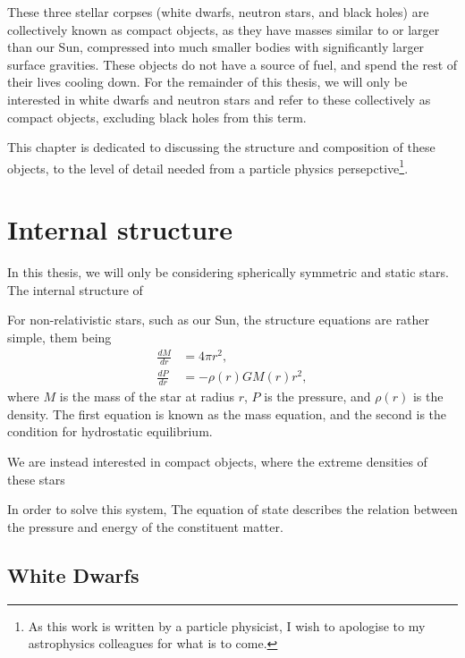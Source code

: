 These three stellar corpses (white dwarfs, neutron stars, and black holes) are collectively known as compact objects, as they have masses similar to or larger than our Sun, compressed into much smaller bodies with significantly larger surface gravities. These objects do not have a source of fuel, and spend the rest of their lives cooling down. For the remainder of this thesis, we will only be interested in white dwarfs and neutron stars and refer to these collectively as compact objects, excluding black holes from this term. 

This chapter is dedicated to discussing the structure and composition of these objects, to the level of detail needed from a particle physics persepctive\footnote{As this work is written by a particle physicist, I wish to apologise to my astrophysics colleagues for what is to come.}.


\section{Internal structure}

In this thesis, we will only be considering spherically symmetric and static stars. 
The internal structure of 

For non-relativistic stars, such as our Sun, the structure equations are
rather simple, them being
\begin{align}
\frac{d M}{dr}  &= 4 \pi r^2,\\
\frac{d P }{dr} &= -\rho(r) G M(r) r^2,
\end{align}
where $M$ is the mass of the star at radius $r$, $P$ is the pressure,
and $\rho(r)$ is the density.
The first equation is known as the mass equation, and the second is the
condition for hydrostatic equilibrium. 

We are instead interested in compact objects, where the extreme densities 
of these stars 

In order to solve this system, 
The equation of state describes the relation between the pressure 
and energy of the constituent matter.


\subsection{White Dwarfs}

